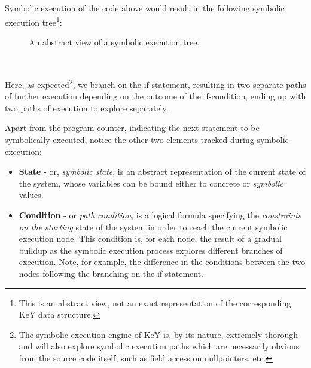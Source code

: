 \documentclass{article}
\newcommand{\tmem}[1]{{\em #1\/}}
\newcommand{\tmstrong}[1]{\textbf{#1}}
\newenvironment{itemizedot}{\begin{itemize} \renewcommand{\labelitemi}{$\bullet$}\renewcommand{\labelitemii}{$\bullet$}\renewcommand{\labelitemiii}{$\bullet$}\renewcommand{\labelitemiv}{$\bullet$}}{\end{itemize}}
\newenvironment{tmparmod}[3]{\begin{list}{}{\setlength{\topsep}{0pt}\setlength{\leftmargin}{#1}\setlength{\rightmargin}{#2}\setlength{\parindent}{#3}\setlength{\listparindent}{\parindent}\setlength{\itemindent}{\parindent}\setlength{\parsep}{\parskip}} \item[]}{\end{list}}
\begin{document}
Symbolic execution of the code above would result in the following symbolic
execution tree{\footnote{This is an abstract view, not an exact representation
of the corresponding KeY data structure.}}:





\begin{tmparmod}{0pt}{1cm}{0pt}
  \begin{tmparmod}{1cm}{0pt}{0pt}
    \begin{figure}[h]
      \caption{An abstract view of a symbolic execution tree.}
    \end{figure}
  \end{tmparmod} \ \ \ \ 
\end{tmparmod}





Here, as expected{\footnote{The symbolic execution engine of KeY is, by its
nature, extremely thorough and will also explore symbolic execution paths
which are necessarily obvious from the source code itself, such as field
access on nullpointers, etc.}}, we branch on the if-statement, resulting in
two separate paths of further execution depending on the outcome of the
if-condition, ending up with two paths of execution to explore separately.



Apart from the program counter, indicating the next statement to be
symbolically executed, notice the other two elements tracked during symbolic
execution:
\begin{itemizedot}
  \item {\tmstrong{State}} - or, {\tmem{symbolic state}}, is an abstract
  representation of the current state of the system, whose variables can be
  bound either to concrete or {\tmem{symbolic}} values.
  
  \item {\tmstrong{Condition}} - or {\tmem{path condition}}, is a logical
  formula specifying the {\tmem{constraints on the starting}} state of the
  system in order to reach the current symbolic execution node. This condition
  is, for each node, the result of a gradual buildup as the symbolic execution
  process explores different branches of execution. Note, for example, the
  difference in the conditions between the two nodes following the branching
  on the if-statement. 
\end{itemizedot}
\end{document}
